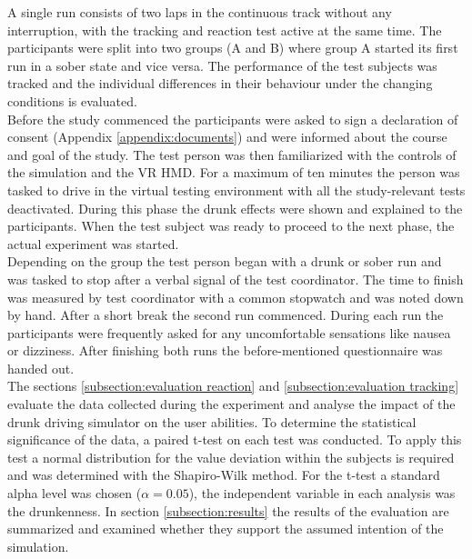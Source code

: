 A single run consists of two laps in the continuous track without any interruption, with the tracking and reaction test active at the same time.
The participants were split into two groups (A and B) where group A started its first run in a sober state and vice versa.
The performance of the test subjects was tracked and the individual differences in their behaviour under the changing conditions is evaluated.
\\
Before the study commenced the participants were asked to sign a declaration of consent (Appendix \ref{appendix:documents}) and were informed about the course and goal of the study.
The test person was then familiarized with the controls of the simulation and the VR HMD.
For a maximum of ten minutes the person was tasked to drive in the virtual testing environment with all the study-relevant tests deactivated.
During this phase the drunk effects were shown and explained to the participants.
When the test subject was ready to proceed to the next phase, the actual experiment was started.
\\
Depending on the group the test person began with a drunk or sober run and was tasked to stop after a verbal signal of the test coordinator.
The time to finish was measured by test coordinator with a common stopwatch and was noted down by hand.
After a short break the second run commenced. 
During each run the participants were frequently asked for any uncomfortable sensations like nausea or dizziness.
After finishing both runs the before-mentioned questionnaire was handed out.
\\
The sections \ref{subsection:evaluation reaction} and \ref{subsection:evaluation tracking} evaluate the data collected during the experiment and analyse the impact of the drunk driving simulator on the user abilities.
To determine the statistical significance of the data, a paired t-test on each test was conducted. \autocite[]{hsu2005paired}
To apply this test a normal distribution for the value deviation within the subjects is required and was determined with the Shapiro-Wilk method. \autocite[]{razali2011power} 
For the t-test a standard alpha level was chosen ($\alpha=0.05$), the independent variable in each analysis was the drunkenness.
In section \ref{subsection:results} the results of the evaluation are summarized and examined whether they support the assumed intention of the simulation.

